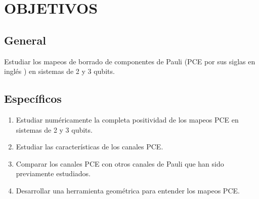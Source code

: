 \chapter{OBJETIVOS}
\section*{General}
Estudiar los mapeos de borrado de componentes de Pauli (PCE por
sus siglas en inglés ) en sistemas de 2 y 3 qubits.


\section*{Específicos}

\begin{enumerate}
\item Estudiar numéricamente la completa positividad de los mapeos 
PCE en sistemas de 2 y 3 qubits.

\item Estudiar las características de los canales PCE.

\item Comparar los canales PCE con otros canales de Pauli que han 
sido previamente estudiados.

\item Desarrollar una herramienta geométrica para entender los 
mapeos PCE.
\end{enumerate}


